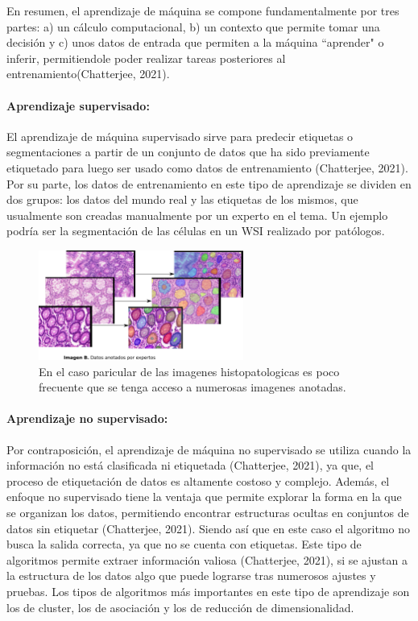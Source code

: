 \documentclass[12pt,letterpaper,final, openany]{scrbook}
\begin{document}
 En resumen, el aprendizaje de máquina se compone fundamentalmente por tres partes: a) un cálculo computacional, b) un contexto que permite tomar una decisión y c) unos datos de entrada que permiten a la máquina ``aprender" o inferir, permitiendole poder realizar tareas posteriores al entrenamiento(Chatterjee, 2021).




\paragraph{Aprendizaje supervisado:}



El aprendizaje de máquina supervisado sirve para predecir etiquetas o segmentaciones a partir de un conjunto de datos que ha sido previamente etiquetado para luego ser usado como datos de entrenamiento (Chatterjee, 2021). Por su parte, los datos de entrenamiento en este tipo de aprendizaje se dividen en dos grupos: los datos del mundo real y las etiquetas de los mismos, que usualmente son creadas manualmente por un experto en el tema. Un ejemplo podría ser la segmentación de las células en un WSI realizado por patólogos.

\begin{figure}[h!]
    \centering
    \includegraphics[width=0.6\textwidth]{labelled.png}
    \caption{En el caso paricular de las imagenes histopatologicas es poco frecuente que se tenga acceso a numerosas imagenes anotadas.}
    \label{fig:labelled}
\end{figure}

\paragraph{Aprendizaje no supervisado:}

Por contraposición, el aprendizaje de máquina no supervisado se utiliza cuando la información no está clasificada ni etiquetada (Chatterjee, 2021), ya que, el proceso de etiquetación de datos es altamente costoso y complejo. Además, el enfoque no supervisado tiene la ventaja que permite explorar la forma en la que se organizan los datos, permitiendo encontrar estructuras ocultas en conjuntos de datos sin etiquetar (Chatterjee, 2021). Siendo así que en este caso el algoritmo no busca la salida correcta, ya que no se cuenta con etiquetas. Este tipo de algoritmos permite extraer información valiosa (Chatterjee, 2021), si se ajustan a la estructura de los datos algo que puede lograrse tras numerosos ajustes y pruebas. Los tipos de algoritmos más importantes en este tipo de aprendizaje son los de cluster, los de asociación y los de reducción de dimensionalidad.
\end{document}
